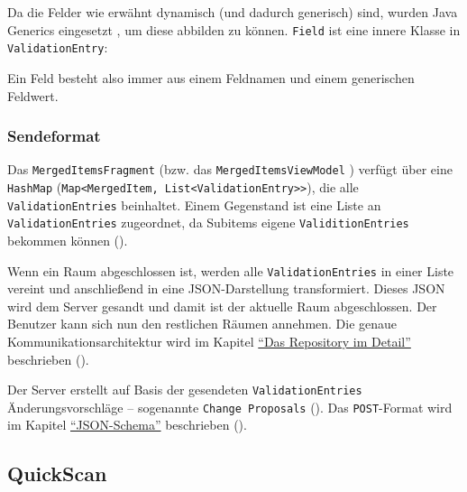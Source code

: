 Da die Felder wie erwähnt dynamisch (und dadurch generisch) sind, wurden
Java Generics eingesetzt \cite{java-generics}, um diese abbilden zu
können. \texttt{Field} ist eine innere Klasse in
\texttt{ValidationEntry}:

\begin{Shaded}
\begin{Highlighting}[]
   
     
\end{Highlighting}
\end{Shaded}

Ein Feld besteht also immer aus einem Feldnamen und einem generischen
Feldwert.

\hypertarget{sendeformat}{%
\subsubsection{Sendeformat}\label{sendeformat}}

Das \texttt{MergedItemsFragment} (bzw. das \texttt{MergedItemsViewModel}
) verfügt über eine \texttt{HashMap}
(\texttt{Map\textless{}MergedItem,\ List\textless{}ValidationEntry\textgreater{}\textgreater{}}),
die alle \texttt{ValidationEntries} beinhaltet. Einem Gegenstand ist
eine Liste an \texttt{ValidationEntries} zugeordnet, da Subitems eigene
\texttt{ValiditionEntries} bekommen können
().

Wenn ein Raum abgeschlossen ist, werden alle \texttt{ValidationEntries}
in einer Liste vereint und anschließend in eine JSON-Darstellung
transformiert. Dieses JSON wird dem Server gesandt und damit ist der
aktuelle Raum abgeschlossen. Der Benutzer kann sich nun den restlichen
Räumen annehmen. Die genaue Kommunikationsarchitektur wird im Kapitel
\protect\hyperlink{das-repository-im-detaila}{``Das Repository im
Detail''} beschrieben ().

Der Server erstellt auf Basis der gesendeten \texttt{ValidationEntries}
Änderungsvorschläge -- sogenannte \texttt{Change\ Proposals}
(). Das \texttt{POST}-Format wird im
Kapitel \protect\hyperlink{json-schema}{``JSON-Schema''} beschrieben
().

\hypertarget{quickscan}{%
\subsection{QuickScan}\label{quickscan}}


